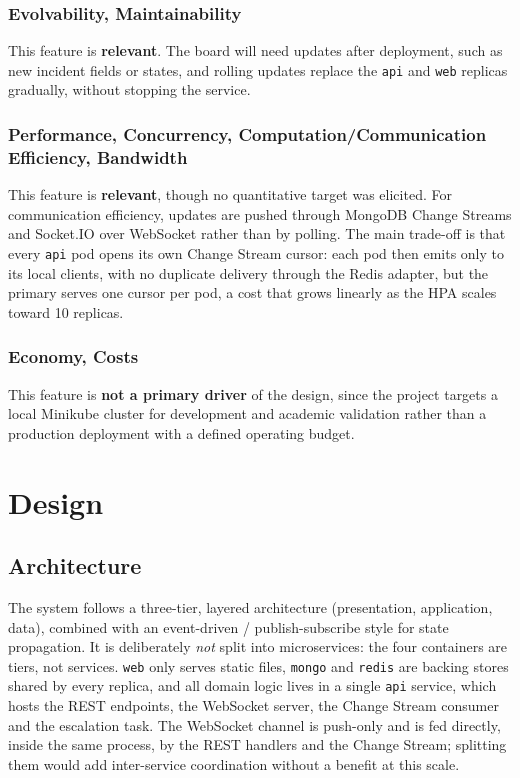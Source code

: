 \documentclass{scrartcl}
\begin{document}
\subsubsection{Evolvability, Maintainability}

This feature is \textbf{relevant}. The board will need updates after deployment, such as new incident fields or states, and rolling updates replace the \texttt{api} and \texttt{web} replicas gradually, without stopping the service. 

\subsubsection{Performance, Concurrency, Computation/Communication Efficiency, Bandwidth}

This feature is \textbf{relevant}, though no quantitative target was elicited. For communication efficiency, updates are pushed through MongoDB Change Streams and Socket.IO over WebSocket rather than by polling. The main trade-off is that every \texttt{api} pod opens its own Change Stream cursor: each pod then emits only to its local clients, with no duplicate delivery through the Redis adapter, but the primary serves one cursor per pod, a cost that grows linearly as the HPA scales toward 10 replicas.

\subsubsection{Economy, Costs}

This feature is \textbf{not a primary driver} of the design, since the project targets a local Minikube cluster for development and academic validation rather than a production deployment with a defined operating budget. 


\section{Design}\label{design}
\subsection{Architecture}\label{architecture}
 
The system follows a three-tier, layered architecture (presentation, application, data), combined with an event-driven / publish-subscribe style for state propagation. It is deliberately \emph{not} split into microservices: the four containers are tiers, not services. \texttt{web} only serves static files, \texttt{mongo} and \texttt{redis} are backing stores shared by every replica, and all domain logic lives in a single \texttt{api} service, which hosts the REST endpoints, the WebSocket server, the Change Stream consumer and the escalation task. The WebSocket channel is push-only and is fed directly, inside the same process, by the REST handlers and the Change Stream; splitting them would add inter-service coordination without a benefit at this scale.
\end{document}
